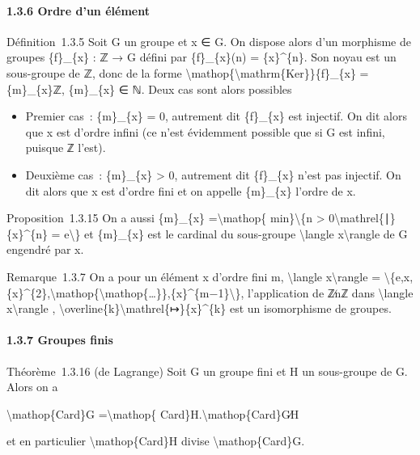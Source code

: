 \documentclass[]{article}
\begin{document}
\paragraph{1.3.6 Ordre d'un élément}

Définition~1.3.5 Soit G un groupe et x ∈ G. On dispose alors d'un
morphisme de groupes \{f\}\_\{x\} : ℤ → G défini par \{f\}\_\{x\}(n) =
\{x\}\^{}\{n\}. Son noyau est un sous-groupe de ℤ, donc de la forme
\textbackslash{}mathop\{\textbackslash{}mathrm\{Ker\}\}\{f\}\_\{x\} =
\{m\}\_\{x\}ℤ, \{m\}\_\{x\} ∈ ℕ. Deux cas sont alors possibles

\begin{itemize}
\itemsep1pt\parskip0pt
\item
  Premier cas~: \{m\}\_\{x\} = 0, autrement dit \{f\}\_\{x\} est
  injectif. On dit alors que x est d'ordre infini (ce n'est évidemment
  possible que si G est infini, puisque ℤ l'est).
\item
  Deuxième cas~: \{m\}\_\{x\} \textgreater{} 0, autrement dit
  \{f\}\_\{x\} n'est pas injectif. On dit alors que x est d'ordre fini
  et on appelle \{m\}\_\{x\} l'ordre de x.
\end{itemize}

Proposition~1.3.15 On a aussi \{m\}\_\{x\} =\textbackslash{}mathop\{
min\}\textbackslash{}\{n \textgreater{}
0\textbackslash{}mathrel\{∣\}\{x\}\^{}\{n\} = e\textbackslash{}\} et
\{m\}\_\{x\} est le cardinal du sous-groupe \textbackslash{}langle
x\textbackslash{}rangle de G engendré par x.

Remarque~1.3.7 On a pour un élément x d'ordre fini m,
\textbackslash{}langle x\textbackslash{}rangle =
\textbackslash{}\{e,x,\{x\}\^{}\{2\},\textbackslash{}mathop\{\textbackslash{}mathop\{\ldots{}\}\},\{x\}\^{}\{m−1\}\textbackslash{}\},
l'application de ℤ∕nℤ dans \textbackslash{}langle
x\textbackslash{}rangle ,
\textbackslash{}overline\{k\}\textbackslash{}mathrel\{↦\}\{x\}\^{}\{k\}
est un isomorphisme de groupes.

\paragraph{1.3.7 Groupes finis}

Théorème~1.3.16 (de Lagrange) Soit G un groupe fini et H un sous-groupe
de G. Alors on a

\textbackslash{}mathop\{Card\}G =\textbackslash{}mathop\{
Card\}H.\textbackslash{}mathop\{Card\}G∕H

et en particulier \textbackslash{}mathop\{Card\}H divise
\textbackslash{}mathop\{Card\}G.
\end{document}
